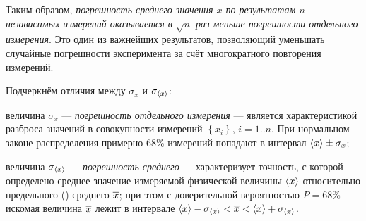 Таким образом, \emph{погрешность среднего значения $x$ по результатам
$n$ независимых измерений оказывается в $\sqrt{n}$ раз меньше погрешности
отдельного измерения}. Это один из важнейших результатов, позволяющий
уменьшать случайные погрешности эксперимента за счёт многократного
повторения измерений.

Подчеркнём отличия между $\sigma_{x}$ и $\sigma_{\left<x\right>}$:

величина $\sigma_{x}$ --- \emph{погрешность отдельного
измерения} --- является характеристикой разброса значений
в совокупности измерений $\left\{ x_{i}\right\} $, $i=1..n$. При
нормальном законе распределения примерно 68\% измерений попадают в
интервал $\left<x\right>\pm\sigma_{x}$;

величина $\sigma_{\left<x\right>}$ --- \emph{погрешность
среднего} --- характеризует точность, с которой определено
среднее значение измеряемой физической величины $\left<x\right>$ относительно
предельного () среднего $\overline{x}$;
при этом с доверительной вероятностью $P=68\%$ искомая величина $\overline{x}$
лежит в интервале
$\left<x\right>-\sigma_{\left<x\right>}<\overline{x}<\left<x\right>+\sigma_{\left<x\right>}$.


